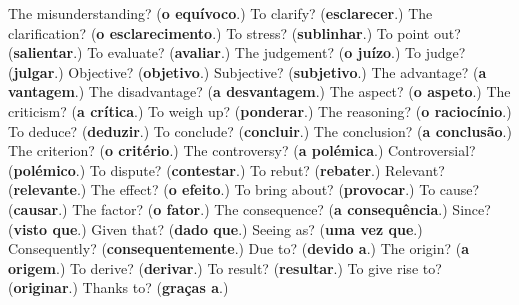 \begin{tcolorbox}[breakable,colback=teal!4,colframe=teal!35!black,title={Before you move on}]
The misunderstanding? (\textbf{o equívoco}.) To clarify? (\textbf{esclarecer}.) The clarification? (\textbf{o esclarecimento}.) To stress? (\textbf{sublinhar}.) To point out? (\textbf{salientar}.) To evaluate? (\textbf{avaliar}.) The judgement? (\textbf{o juízo}.) To judge? (\textbf{julgar}.) Objective? (\textbf{objetivo}.) Subjective? (\textbf{subjetivo}.) The advantage? (\textbf{a vantagem}.) The disadvantage? (\textbf{a desvantagem}.) The aspect? (\textbf{o aspeto}.) The criticism? (\textbf{a crítica}.) To weigh up? (\textbf{ponderar}.) The reasoning? (\textbf{o raciocínio}.) To deduce? (\textbf{deduzir}.) To conclude? (\textbf{concluir}.) The conclusion? (\textbf{a conclusão}.) The criterion? (\textbf{o critério}.) The controversy? (\textbf{a polémica}.) Controversial? (\textbf{polémico}.) To dispute? (\textbf{contestar}.) To rebut? (\textbf{rebater}.) Relevant? (\textbf{relevante}.) The effect? (\textbf{o efeito}.) To bring about? (\textbf{provocar}.) To cause? (\textbf{causar}.) The factor? (\textbf{o fator}.) The consequence? (\textbf{a consequência}.) Since? (\textbf{visto que}.) Given that? (\textbf{dado que}.) Seeing as? (\textbf{uma vez que}.) Consequently? (\textbf{consequentemente}.) Due to? (\textbf{devido a}.) The origin? (\textbf{a origem}.) To derive? (\textbf{derivar}.) To result? (\textbf{resultar}.) To give rise to? (\textbf{originar}.) Thanks to? (\textbf{graças a}.)
\end{tcolorbox}
